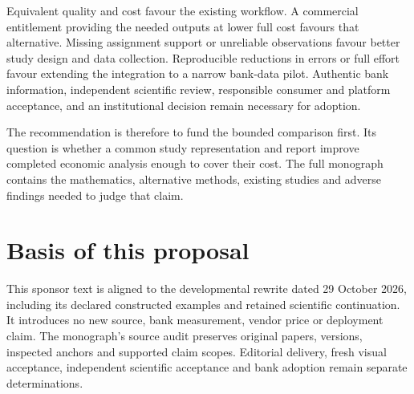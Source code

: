 \documentclass[11pt,a4paper,openany]{book}
\begin{document}
Equivalent quality and cost favour the existing workflow. A commercial
entitlement providing the needed outputs at lower full cost favours that
alternative. Missing assignment support or unreliable observations favour
better study design and data collection. Reproducible reductions in errors
or full effort favour extending the integration to a narrow bank-data
pilot. Authentic bank information, independent scientific review, responsible
consumer and platform acceptance, and an institutional decision remain
necessary for adoption.

The recommendation is therefore to fund the bounded comparison first. Its
question is whether a common study representation and report improve
completed economic analysis enough to cover their cost. The full monograph
contains the mathematics, alternative methods, existing studies and adverse
findings needed to judge that claim.

\section*{Basis of this proposal}
This sponsor text is aligned to the developmental rewrite dated
29 October 2026, including its declared constructed examples and retained
scientific continuation. It introduces no new source, bank measurement,
vendor price or deployment claim. The monograph's source audit preserves
original papers, versions, inspected anchors and supported claim scopes.
Editorial delivery, fresh visual acceptance, independent scientific
acceptance and bank adoption remain separate determinations.
\end{document}
